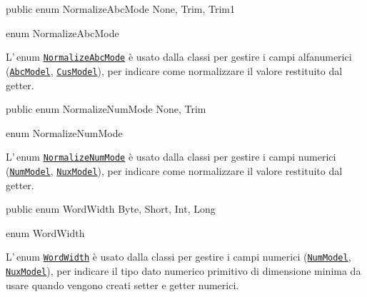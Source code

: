 \documentclass[a4paper,10pt]{report}
\newif\ifesource
\newenvironment{elisting}[1][H]
  {\captionsetup{aboveskip=0pt}\begin{listing}[#1]}
  {\end{listing}%
}
\begin{document}
\ifesource
\begin{lstlisting}[language=java, 
caption=enum NormalizeAbcMode, 
label=lst:NormalizeAbcMode]
public enum NormalizeAbcMode { None, Trim, Trim1 }
\end{lstlisting}\index{NormalizeAbcMode}
\else
\begin{elisting}
\begin{javacode}
public enum NormalizeAbcMode { None, Trim, Trim1 }
\end{javacode}
\caption{enum NormalizeAbcMode}\label{lst:NormalizeAbcMode}
\end{elisting}
\fi
L'\,enum \hyperref[lst:NormalizeAbcMode]{\texttt{NormalizeAbcMode}} è usato 
dalla classi per gestire i campi alfanumerici 
(\hyperref[lst:AbcModel]{\texttt{AbcModel}},
\hyperref[lst:CusModel]{\texttt{CusModel}}), per indicare come normalizzare
il valore restituito dal getter.

\ifesource
\begin{lstlisting}[language=java, 
caption=enum NormalizeNumMode, 
label=lst:NormalizeNumMode]
public enum NormalizeNumMode { None, Trim }
\end{lstlisting}\index{NormalizeNumMode}
\else
\begin{elisting}
\begin{javacode}
public enum NormalizeNumMode { None, Trim }
\end{javacode}
\caption{enum NormalizeNumMode}\label{lst:NormalizeNumMode}
\end{elisting}
\fi
L'\,enum \hyperref[lst:NormalizeNumMode]{\texttt{NormalizeNumMode}} è usato 
dalla classi per gestire i campi numerici 
(\hyperref[lst:NumModel]{\texttt{NumModel}},
\hyperref[lst:NuxModel]{\texttt{NuxModel}}), per indicare come normalizzare
il valore restituito dal getter.

\ifesource
\begin{lstlisting}[language=java, 
caption=enum WordWidth, 
label=lst:WordWidth]
public enum WordWidth { Byte, Short, Int, Long }
\end{lstlisting}\index{WordWidth}
\else
\begin{elisting}
\begin{javacode}
public enum WordWidth { Byte, Short, Int, Long }
\end{javacode}
\caption{enum WordWidth}\label{lst:WordWidth}
\end{elisting}
\fi
L'\,enum \hyperref[lst:WordWidth]{\texttt{WordWidth}} è usato 
dalla classi per gestire i campi numerici 
(\hyperref[lst:NumModel]{\texttt{NumModel}},
\hyperref[lst:NuxModel]{\texttt{NuxModel}}), per indicare il tipo dato numerico
primitivo di dimensione minima da usare quando vengono creati setter e getter
numerici.
\end{document}
